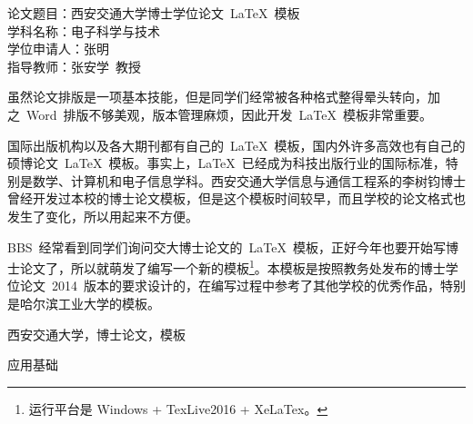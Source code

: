 
\clearpage
\titlespacing{\chapter}{0pt}{23mm}{5mm}

\setcounter{page}{1}
\vskip-50mm
{\hei
	\noindent 论文题目：西安交通大学博士学位论文~\LaTeX~模板 \\
	\noindent 学科名称：电子科学与技术 \\
	\noindent 学位申请人：张明 \\
	\noindent 指导教师：张安学~教授
}
\vskip24mm


虽然论文排版是一项基本技能，但是同学们经常被各种格式整得晕头转向，加之~Word~排版不够美观，版本管理麻烦，因此开发~\LaTeX~模板非常重要。

国际出版机构以及各大期刊都有自己的~\LaTeX~模板，国内外许多高效也有自己的硕博论文~\LaTeX~模板。事实上，\LaTeX~已经成为科技出版行业的国际标准，特别是数学、计算机和电子信息学科。西安交通大学信息与通信工程系的李树钧博士曾经开发过本校的博士论文模板，但是这个模板时间较早，而且学校的论文格式也发生了变化，所以用起来不方便。

BBS~经常看到同学们询问交大博士论文的~\LaTeX~模板，正好今年也要开始写博士论文了，所以就萌发了编写一个新的模板\footnote{运行平台是 \color{red}Windows + TexLive2016 + XeLaTex。}。本模板是按照教务处发布的博士学位论文~2014~版本的要求设计的，在编写过程中参考了其他学校的优秀作品，特别是哈尔滨工业大学的模板。

\vspace{\baselineskip}
 西安交通大学，博士论文，模板

\vspace{\baselineskip}
 应用基础

\clearpage
{}
{}

\titlespacing{\chapter}{0pt}{22mm}{5mm}
